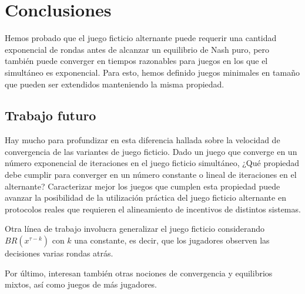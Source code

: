 \chapter{Conclusiones}  \label{cap:conclusiones}

Hemos probado que el juego ficticio alternante puede requerir una cantidad exponencial de rondas antes de alcanzar un equilibrio de Nash puro, pero también puede converger en tiempos razonables para juegos en los que el simultáneo es exponencial. Para esto, hemos definido juegos minimales en tamaño que pueden ser extendidos manteniendo la misma propiedad.

\section{Trabajo futuro} 

Hay mucho para profundizar en esta diferencia hallada sobre la velocidad de convergencia de las variantes de juego ficticio. Dado un juego que converge en un número exponencial de iteraciones en el juego ficticio simultáneo, ¿Qué propiedad debe cumplir para converger en un número constante o lineal de iteraciones en el alternante? Caracterizar mejor los juegos que cumplen esta propiedad puede avanzar la posibilidad de la utilización práctica del juego ficticio alternante en protocolos reales que requieren el alineamiento de incentivos de distintos sistemas.

Otra línea de trabajo involucra generalizar el juego ficticio considerando $BR(x^{\tau-k})$ con $k$ una constante, es decir, que los jugadores observen las decisiones varias rondas atrás.

Por último, interesan también otras nociones de convergencia y equilibrios mixtos, así como juegos de más jugadores.
